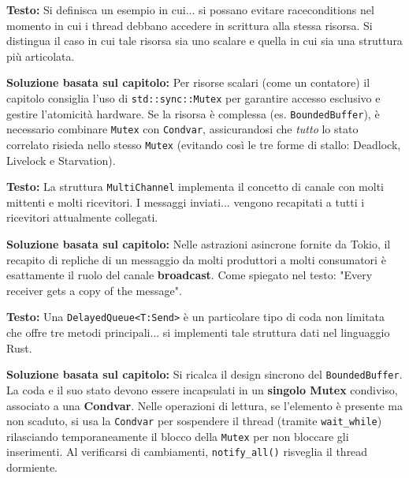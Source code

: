 \begin{exambox}
\textbf{Testo:} Si definisca un esempio in cui... si possano evitare raceconditions nel momento in cui i thread debbano accedere in scrittura alla stessa risorsa. Si distingua il caso in cui tale risorsa sia uno scalare e quella in cui sia una struttura più articolata.

\textbf{Soluzione basata sul capitolo:} Per risorse scalari (come un contatore) il capitolo consiglia l'uso di \texttt{std::sync::Mutex} per garantire accesso esclusivo e gestire l'atomicità hardware. Se la risorsa è complessa (es. \texttt{BoundedBuffer}), è necessario combinare \texttt{Mutex} con \texttt{Condvar}, assicurandosi che \textit{tutto} lo stato correlato risieda nello stesso \texttt{Mutex} (evitando così le tre forme di stallo: Deadlock, Livelock e Starvation).
\end{exambox}

\begin{exambox}
\textbf{Testo:} La struttura \texttt{MultiChannel} implementa il concetto di canale con molti mittenti e molti ricevitori. I messaggi inviati... vengono recapitati a tutti i ricevitori attualmente collegati.

\textbf{Soluzione basata sul capitolo:} Nelle astrazioni asincrone fornite da Tokio, il recapito di repliche di un messaggio da molti produttori a molti consumatori è esattamente il ruolo del canale \textbf{broadcast}. Come spiegato nel testo: "Every receiver gets a copy of the message".
\end{exambox}

\begin{exambox}
\textbf{Testo:} Una \texttt{DelayedQueue<T:Send>} è un particolare tipo di coda non limitata che offre tre metodi principali... si implementi tale struttura dati nel linguaggio Rust.

\textbf{Soluzione basata sul capitolo:} Si ricalca il design sincrono del \texttt{BoundedBuffer}. La coda e il suo stato devono essere incapsulati in un \textbf{singolo Mutex} condiviso, associato a una \textbf{Condvar}. Nelle operazioni di lettura, se l'elemento è presente ma non scaduto, si usa la \texttt{Condvar} per sospendere il thread (tramite \texttt{wait\_while}) rilasciando temporaneamente il blocco della \texttt{Mutex} per non bloccare gli inserimenti. Al verificarsi di cambiamenti, \texttt{notify\_all()} risveglia il thread dormiente.
\end{exambox}


